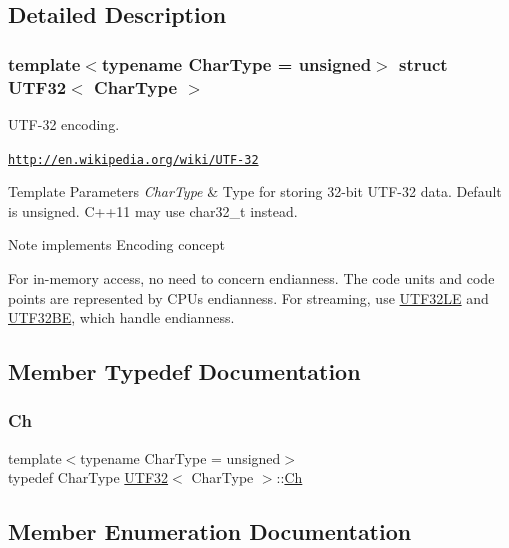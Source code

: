 \subsection{Detailed Description}
\subsubsection*{template$<$typename Char\+Type = unsigned$>$\newline
struct U\+T\+F32$<$ Char\+Type $>$}

U\+T\+F-\/32 encoding. 

\href{http://en.wikipedia.org/wiki/UTF-32}{\tt http\+://en.\+wikipedia.\+org/wiki/\+U\+T\+F-\/32} 
\begin{DoxyTemplParams}{Template Parameters}
{\em Char\+Type} & Type for storing 32-\/bit U\+T\+F-\/32 data. Default is unsigned. C++11 may use char32\+\_\+t instead. \\
\hline
\end{DoxyTemplParams}
\begin{DoxyNote}{Note}
implements Encoding concept

For in-\/memory access, no need to concern endianness. The code units and code points are represented by C\+PU\textquotesingle{}s endianness. For streaming, use \hyperlink{structUTF32LE}{U\+T\+F32\+LE} and \hyperlink{structUTF32BE}{U\+T\+F32\+BE}, which handle endianness. 
\end{DoxyNote}


\subsection{Member Typedef Documentation}
\mbox{\label{structUTF32_ab4502672d56436e730ca5f647bb52be9}} 
\subsubsection{\texorpdfstring{Ch}{Ch}}
{\footnotesize\ttfamily template$<$typename Char\+Type  = unsigned$>$ \\
typedef Char\+Type \hyperlink{structUTF32}{U\+T\+F32}$<$ Char\+Type $>$\+::\hyperlink{structUTF32_ab4502672d56436e730ca5f647bb52be9}{Ch}}



\subsection{Member Enumeration Documentation}
\mbox{\label{structUTF32_ab0e36a7527093764bfa9f0a504187fc3}} 
